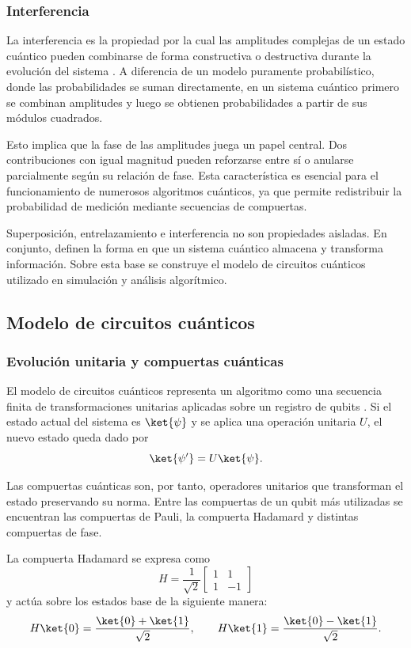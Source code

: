 \subsubsection{Interferencia}

La interferencia es la propiedad por la cual las amplitudes complejas de un estado cuántico pueden combinarse de forma constructiva o destructiva durante la evolución del sistema \cite{Nielsen2010}. A diferencia de un modelo puramente probabilístico, donde las probabilidades se suman directamente, en un sistema cuántico primero se combinan amplitudes y luego se obtienen probabilidades a partir de sus módulos cuadrados.

Esto implica que la fase de las amplitudes juega un papel central. Dos contribuciones con igual magnitud pueden reforzarse entre sí o anularse parcialmente según su relación de fase. Esta característica es esencial para el funcionamiento de numerosos algoritmos cuánticos, ya que permite redistribuir la probabilidad de medición mediante secuencias de compuertas.

Superposición, entrelazamiento e interferencia no son propiedades aisladas. En conjunto, definen la forma en que un sistema cuántico almacena y transforma información. Sobre esta base se construye el modelo de circuitos cuánticos utilizado en simulación y análisis algorítmico.

\subsection{\normalsize{Modelo de circuitos cuánticos}}

\subsubsection{Evolución unitaria y compuertas cuánticas}

El modelo de circuitos cuánticos representa un algoritmo como una secuencia finita de transformaciones unitarias aplicadas sobre un registro de qubits \cite{Nielsen2010}. Si el estado actual del sistema es $\ket{\psi}$ y se aplica una operación unitaria $U$, el nuevo estado queda dado por
\[
    \ket{\psi'} = U\ket{\psi}.
\]

Las compuertas cuánticas son, por tanto, operadores unitarios que transforman el estado preservando su norma. Entre las compuertas de un qubit más utilizadas se encuentran las compuertas de Pauli, la compuerta Hadamard y distintas compuertas de fase.

La compuerta Hadamard se expresa como
\[
    H = \frac{1}{\sqrt{2}}
    \begin{bmatrix}
        1 & 1 \\
        1 & -1
    \end{bmatrix}
\]
y actúa sobre los estados base de la siguiente manera:
\[
    H\ket{0} = \frac{\ket{0} + \ket{1}}{\sqrt{2}}, \qquad
    H\ket{1} = \frac{\ket{0} - \ket{1}}{\sqrt{2}}.
\]

